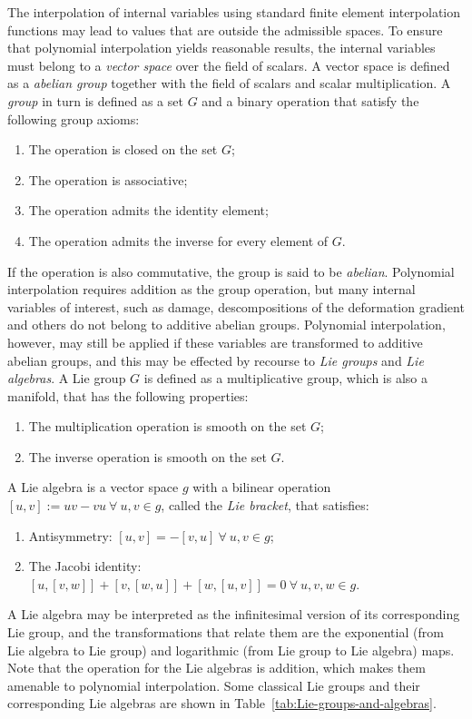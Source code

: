 \documentclass[12pt]{article}
\begin{document}
The interpolation of internal variables using standard finite element
interpolation functions may lead to values that are outside the
admissible spaces. To ensure that polynomial interpolation yields
reasonable results, the internal variables must belong to a
\emph{vector space} over the field of scalars. A vector space is
defined as a \emph{abelian group} together with the field of scalars
and scalar multiplication. A \emph{group} in turn is defined as a set
$G$ and a binary operation that satisfy the following group axioms:
\begin{enumerate}
  \item The operation is closed on the set $G$;
  \item The operation is associative;
  \item The operation admits the identity element;
  \item The operation admits the inverse for every element of $G$.
\end{enumerate}
If the operation is also commutative, the group is said to be
\emph{abelian}. Polynomial interpolation requires addition as the
group operation, but many internal variables of interest, such as
damage, descompositions of the deformation gradient and others do not
belong to additive abelian groups. Polynomial interpolation, however,
may still be applied if these variables are transformed to additive
abelian groups, and this may be effected by recourse to \emph{Lie
  groups} and \emph{Lie algebras}. A Lie group $G$ is defined as a
multiplicative group, which is also a manifold, that has the following
properties:
\begin{enumerate}
  \item The multiplication operation is smooth on the set $G$;
  \item The inverse operation is smooth on the set $G$.
\end{enumerate}
A Lie algebra is a vector space $g$ with a bilinear operation $[u,v]
:= uv - vu \: \forall \: u,v \in g$, called the \emph{Lie bracket}, that
satisfies:
\begin{enumerate}
  \item Antisymmetry: $[u,v] = - [v,u] \: \forall \: u,v \in g$;
  \item The Jacobi identity: $[u,[v,w]] + [v,[w,u]] + [w,[u,v]] = 0 \:
    \forall \: u,v,w \in g$.
\end{enumerate}
A Lie algebra may be interpreted as the infinitesimal version of its
corresponding Lie group, and the transformations that relate them are
the exponential (from Lie algebra to Lie group) and logarithmic (from
Lie group to Lie algebra) maps. Note that the operation for the Lie
algebras is addition, which makes them amenable to polynomial
interpolation. Some classical Lie groups and their corresponding Lie
algebras are shown in Table~\ref{tab:Lie-groups-and-algebras}.
\end{document}
